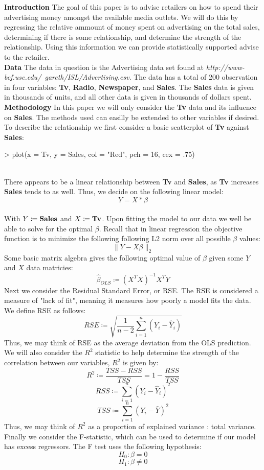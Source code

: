 \documentclass{article}
\begin{document}
\textbf{Introduction}
The goal of this paper is to advise retailers on how to spend their advertising money amongst the available media outlets. We will do this by regressing the relative ammount of money spent on advertising on the total sales, determining if there is some relationship, and determine the strength of the relationship. Using this information we can provide statistically supported advise to the retailer.\\
\textbf{Data}
The data in question is the Advertising data set found at \emph{http://www-bcf.usc.edu/~gareth/ISL/Advertising.csv}. The data has a total of 200 observation in four variables: \textbf{Tv}, \textbf{Radio}, \textbf{Newspaper}, and \textbf{Sales}. The \textbf{Sales} data is given in thousands of units, and all other data is given in thousands of dollars spent.\\
\textbf{Methodology}
In this paper we will only consider the \textbf{Tv} data and its influence on \textbf{Sales}. The methods used can easilly be extended to other variables if desired.
To describe the relationship we first consider a basic scatterplot of \textbf{Tv} against \textbf{Sales}: \\
\begin{Schunk}
\begin{Sinput}
> plot(x = Tv, y =  Sales, col = "Red", pch = 16, cex = .75)
\end{Sinput}
\end{Schunk}
\\
There appears to be a linear relationship between \textbf{Tv} and \textbf{Sales}, as \textbf{Tv} increases \textbf{Sales} tends to as well. Thus, we decide on the following linear model:
$$ Y = X*\beta $$ \\
With $Y \coloneqq \bold{Sales}$ and $X \coloneqq \bold{Tv}$. Upon fitting the model to our data we well be able to solve for the optimal $\beta$. Recall that in linear regression the objective function is to minimize the following following L2 norm over all possible $\beta$ values:
$$ \lVert Y - X\beta \rVert_{2} $$
Some basic matrix algebra gives the following optimal value of $\beta$ given some $Y$ and $X$ data matricies:
$$ \hat{\beta}_{OLS} \coloneqq (X^{T}X)^{-1}X^{T}Y $$
Next we consider the Residual Standard Error, or RSE. The RSE is considered a measure of "lack of fit", meaning it measures how poorly a model fits the data. We define RSE as follows:
$$ RSE \coloneqq \sqrt{\dfrac{1}{n-2}\sum_{i=1}^{n} (Y_{i} - \hat{Y}_{i})} $$
Thus, we may think of RSE as the average deviation from the OLS prediction.\\
We will also consider the $R^{2}$ statistic to help determine the strength of the correlation between our variables, $R^{2}$ is given by:
$$ R^{2} \coloneqq \dfrac{TSS - RSS}{TSS} = 1 - \dfrac{RSS}{TSS} $$
$$ RSS \coloneqq \sum_{i=1}^{n} (Y_{i} - \hat{Y}_{i})^{2} $$
$$ TSS \coloneqq \sum_{i=1}^{n} (Y_{i} - \bar{Y})^{2} $$
Thus, we may think of $R^{2}$ as a proportion of explained variance : total variance.\\
Finally we consider the F-statistic, which can be used to determine if our model has excess regressors. The F test uses the following hypothesis:
$$ H_{0} : \beta = 0$$
$$ H_{1} : \beta \neq 0$$
\end{document}
